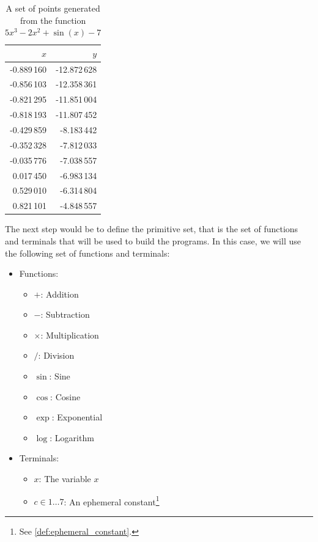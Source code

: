   \begin{table}[ht!]
    \centering
    \begin{tabular}{|r|r|}
      \hline
      \(x\) & \(y\) \\
      \hline
      \hline
      -0.889\,160    & -12.872\,628 \\
      \hline
      -0.856\,103   & -12.358\,361 \\
      \hline
      -0.821\,295   & -11.851\,004 \\
      \hline
      -0.818\,193   & -11.807\,452 \\
      \hline
      -0.429\,859   & -8.183\,442  \\
      \hline
      -0.352\,328   & -7.812\,033  \\
      \hline
      -0.035\,776   & -7.038\,557  \\
      \hline
      0.017\,450  & -6.983\,134  \\
      \hline
      0.529\,010    & -6.314\,804 \\
      \hline
      0.821\,101    & -4.848\,557  \\
      \hline
    \end{tabular}
    \caption{
      A set of points generated from the function \(5x^3 - 2x^2 + \sin(x) - 7\)
    }
    \label{tab:genetic_programming:representation:points}
  \end{table}

  The next step would be to define the primitive set, that is the set of
  functions and terminals that will be used to build the programs.
  In this case, we will use the following set of functions and terminals:

  \begin{itemize}
    \item Functions:
      \begin{itemize}
        \item \(+\): Addition
        \item \(-\): Subtraction
        \item \(\times\): Multiplication
        \item \(/\): Division
        \item \(\sin\): Sine
        \item \(\cos\): Cosine
        \item \(\exp\): Exponential
        \item \(\log\): Logarithm
      \end{itemize}
    \item Terminals:
      \begin{itemize}
        \item \(x\): The variable \(x\)
        \item \(c \in 1 \dots 7\): An ephemeral constant\footnote{
            See \vref{def:ephemeral_constant}.
          }
      \end{itemize}
  \end{itemize}

